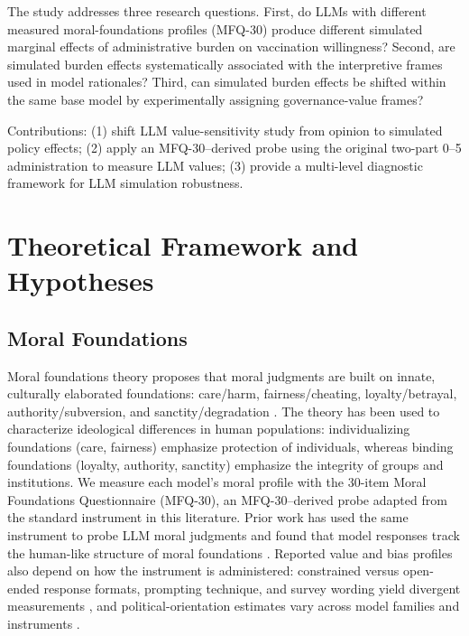 \documentclass[12pt,a4paper]{article}
\begin{document}
The study addresses three research questions. First, do LLMs with different measured moral-foundations profiles (MFQ-30) produce different simulated marginal effects of administrative burden on vaccination willingness? Second, are simulated burden effects systematically associated with the interpretive frames used in model rationales? Third, can simulated burden effects be shifted within the same base model by experimentally assigning governance-value frames?

Contributions: (1) shift LLM value-sensitivity study from opinion to simulated policy effects; (2) apply an MFQ-30--derived probe using the original two-part 0--5 administration to measure LLM values; (3) provide a multi-level diagnostic framework for LLM simulation robustness.

\section{Theoretical Framework and Hypotheses}


\subsection{Moral Foundations}
\label{sec:orientation-effect}

Moral foundations theory proposes that moral judgments are built on innate, culturally elaborated foundations: care/harm, fairness/cheating, loyalty/betrayal, authority/subversion, and sanctity/degradation \citep{Graham2011,Graham2013}. The theory has been used to characterize ideological differences in human populations: individualizing foundations (care, fairness) emphasize protection of individuals, whereas binding foundations (loyalty, authority, sanctity) emphasize the integrity of groups and institutions. We measure each model's moral profile with the 30-item Moral Foundations Questionnaire (MFQ-30), an MFQ-30--derived probe adapted from the standard instrument in this literature. Prior work has used the same instrument to probe LLM moral judgments and found that model responses track the human-like structure of moral foundations \citep{Abdulhai2023,Abdulhai2024}. Reported value and bias profiles also depend on how the instrument is administered: constrained versus open-ended response formats, prompting technique, and survey wording yield divergent measurements \citep{Rottger2024,Tjuatja2024,Faulborn2025}, and political-orientation estimates vary across model families and instruments \citep{Motoki2024,Rozado2024,Bang2024,Peng2026}.
\end{document}
